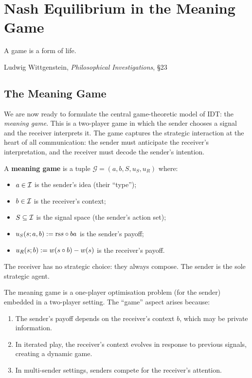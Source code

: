 \chapter{Nash Equilibrium in the Meaning Game}
\label{ch:nash}

\epigraph{A game is a form of life.}{Ludwig Wittgenstein,
\textit{Philosophical Investigations}, \S23}

\section{The Meaning Game}

We are now ready to formulate the central game-theoretic model of IDT: the
\emph{meaning game}.  This is a two-player game in which the sender chooses a
signal and the receiver interprets it.  The game captures the strategic
interaction at the heart of all communication: the sender must anticipate the
receiver's interpretation, and the receiver must decode the sender's intention.

\begin{definition}
\label{def:meaning-game}
A \textbf{meaning game} is a tuple $\mathcal{G} = (a, b, S, u_S, u_R)$ where:
\begin{itemize}
\item $a \in \mathcal{I}$ is the sender's idea (their ``type'');
\item $b \in \mathcal{I}$ is the receiver's context;
\item $S \subseteq \mathcal{I}$ is the signal space (the sender's action set);
\item $u_S(s; a, b) := \mathrm{rs}{s \circ b}{a}$ is the sender's payoff;
\item $u_R(s; b) := w(s \circ b) - w(s)$ is the receiver's payoff.
\end{itemize}
The receiver has no strategic choice: they always compose.  The sender
is the sole strategic agent.
\end{definition}

\begin{remark}
The meaning game is a one-player optimisation problem (for the sender)
embedded in a two-player setting.  The ``game'' aspect arises because:
\begin{enumerate}
\item The sender's payoff depends on the receiver's context $b$, which may be
  private information.
\item In iterated play, the receiver's context evolves in response to previous
  signals, creating a dynamic game.
\item In multi-sender settings, senders compete for the receiver's attention.
\end{enumerate}
\end{remark}

